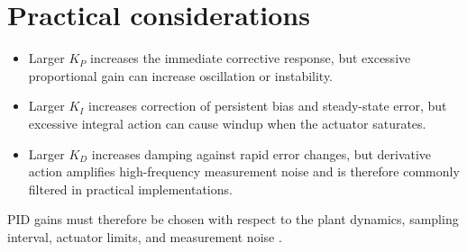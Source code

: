\documentclass[a4paper]{article}
\begin{document}
   \section{Practical considerations}
      \begin{itemize}
         \item Larger $K_P$ increases the immediate corrective response, but excessive proportional gain can increase oscillation or instability.
         \item Larger $K_I$ increases correction of persistent bias and steady-state error, but excessive integral action can cause windup when the actuator saturates.
         \item Larger $K_D$ increases damping against rapid error changes, but derivative action amplifies high-frequency measurement noise and is therefore commonly filtered in practical implementations.
      \end{itemize}

      PID gains must therefore be chosen with respect to the plant dynamics, sampling interval, actuator limits, and measurement noise \cite{astrom-2008-feedback-systems-an-introduction-for-scientists-and-engineers}.

   
   
\end{document}
